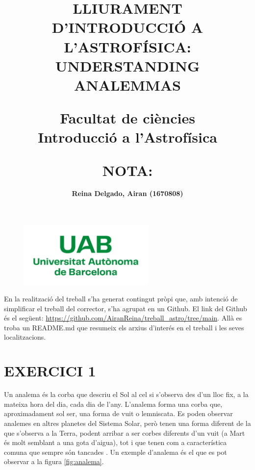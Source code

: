 \documentclass[a4paper, 11pt]{article}
\begin{document}
\begin{figure}
    \centering
    \includegraphics[width=0.6\textwidth]{images/Logo_uab.png}
    \label{uab}
\end{figure}

\title{{\textbf{\Large LLIURAMENT D'INTRODUCCIÓ A L'ASTROFÍSICA: UNDERSTANDING ANALEMMAS
}\\}

\vspace{12mm}

{\large Facultat de ciències}\\
{\large Introducció a l'Astrofísica}}

\author{\textbf{Reina Delgado, Airan (1670808)}}
\date{}


\maketitle

\vspace{70mm} \title{\textbf{\Large NOTA:}}



    \vspace{4mm} 
    \noindent En la realització del treball s'ha generat contingut pròpi que, amb intenció de simplificar el treball del corrector, s'ha agrupat en un Github. El link del Github és el següent: \url{https://github.com/AiranReina/treball_astro/tree/main}. Allà es troba un README.md que resumeix els arxius d'interés en el treball i les seves localitzacions. 
    \newpage


\section*{EXERCICI 1}

\noindent Un analema és la corba que descriu el Sol al cel si s’observa des d'un lloc fix, a la mateixa hora del dia, cada dia de l’any. L’analema forma una corba que, aproximadament sol ser, una forma de vuit o lemniscata. Es poden observar analemes en altres planetes del Sistema Solar, però tenen una forma diferent de la que s’observa a la Terra, podent arribar a ser corbes diferents d’un vuit (a Mart és molt semblant a una gota d’aigua), tot i que tenen com a característica comuna que sempre són tancades \cite{DEFINICIO_ANALEMA}. Un exemple d’analema és el que es pot observar a la figura \ref{fig:analema}.
\end{document}

